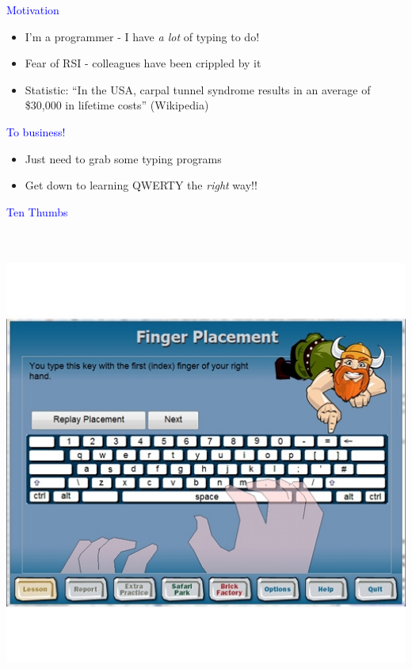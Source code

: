 \documentclass[landscape]{slides}
\begin{document}
\begin{slide}

    \textcolor{blue}{\Large{Motivation}}

    \begin{itemize}
        \item I'm a programmer - I have \emph{a lot} of typing to do!
        \item Fear of RSI - colleagues have been crippled by it
        \item Statistic: ``In the USA, carpal tunnel syndrome results in an average of \$30,000 in lifetime costs'' \small{(Wikipedia)}
    \end{itemize}

\end{slide}


\begin{slide}

    \textcolor{blue}{\Large{To business!}}

    \begin{itemize}
        \item Just need to grab some typing programs
        \item Get down to learning QWERTY the \emph{right} way!!
    \end{itemize}

\end{slide}


\begin{slide}

    \textcolor{blue}{\Large{Ten Thumbs}}

    \centering

    \includegraphics[height=15.5cm]{ten-thumbs}

\end{slide}
\end{document}
